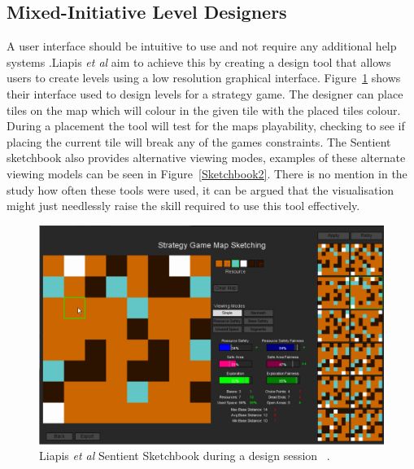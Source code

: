 \documentclass[journal]{IEEEtran}
\begin{document}
\subsection{Mixed-Initiative Level Designers } \label{UI}
A user interface should be intuitive to use and not require any additional help systems \cite{oppermann2002user}.Liapis \textit{et al} \cite{liapis2013sentient} aim to achieve this by  creating a design tool that allows users to create levels using a low resolution graphical interface. Figure~\ref{Sketchbook} shows their interface used to design levels for a strategy game. The designer can place tiles on the map which will colour in the given tile with the placed tiles colour. During a placement the tool will test for the maps playability, checking to see if placing the current tile will break any of the games constraints.  The Sentient sketchbook also provides alternative viewing modes, examples of these alternate viewing models can be seen in Figure~\ref{Sketchbook2}.  There is no mention in the study how often these tools were used, it can be argued that the visualisation might just needlessly raise the skill required to use this tool effectively.

\begin{figure}[h]
	\includegraphics[width=1.0\linewidth]{SentientSketchbook.PNG}
	\caption{Liapis \textit{et al} Sentient Sketchbook during a design session ~\cite{liapis2013sentient}.}
	\label{Sketchbook}
\end{figure} 
\end{document}

